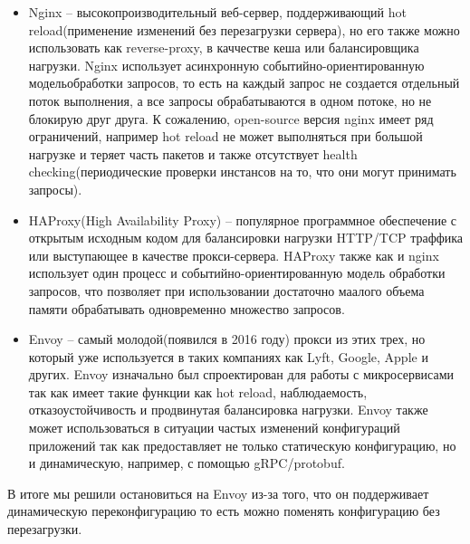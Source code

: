 \begin{itemize}
	\item Nginx \cite{nginx} -- высокопроизводительный веб-сервер, поддерживающий hot reload(применение изменений без перезагрузки сервера), но его также можно использовать как reverse-proxy, в каччестве кеша или балансировщика нагрузки. Nginx использует асинхронную событийно-ориентированную модельобработки запросов, то есть на каждый запрос не создается отдельный поток выполнения, а все запросы обрабатываются в одном потоке, но не блокирую друг друга. К сожалению, open-source версия nginx имеет ряд ограничений, например hot reload не может выполняться при большой нагрузке и теряет часть пакетов и также отсутствует health checking(периодические проверки инстансов на то, что они могут принимать запросы). 
	\item HAProxy(High Availability Proxy) \cite{HAProxy} -- популярное программное обеспечение с открытым исходным кодом для балансировки нагрузки HTTP/TCP траффика или выступающее в качестве прокси-сервера. HAProxy также как и nginx использует один процесс и событийно-ориентированную модель обработки запросов, что позволяет при использовании достаточно маалого объема памяти обрабатывать одновременно множество запросов.
	\item Envoy \cite{Envoy} -- самый молодой(появился в 2016 году) прокси из этих трех, но который уже используется в таких компаниях как Lyft, Google, Apple и других. Envoy изначально был спроектирован для работы с микросервисами так как имеет такие функции как hot reload, наблюдаемость, отказоустойчивость и продвинутая балансировка нагрузки. Envoy также может использоваться в ситуации частых изменений конфигураций приложений так как предоставляет не только статическую конфигурацию, но и динамическую, например, с помощью gRPC/protobuf.
\end{itemize}

В итоге мы решили остановиться на Envoy из-за того, что он поддерживает динамическую переконфигурацию то есть можно поменять конфигурацию без перезагрузки.

